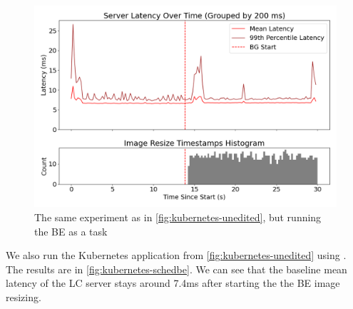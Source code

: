 \begin{figure}[t]
    \centering
    \includegraphics[width=\columnwidth]{graphs/kubernetes-schedbe.png}
    \caption{The same experiment as in \autoref{fig:kubernetes-unedited}, but
    running the BE as a \beclass{} task}\label{fig:kubernetes-schedbe}
\end{figure}

We also run the Kubernetes application from \autoref{fig:kubernetes-unedited}
using \beclass{}. The results are in \autoref{fig:kubernetes-schedbe}. We can
see that the baseline mean latency of the LC server stays around 7.4ms after
starting the the BE image resizing.